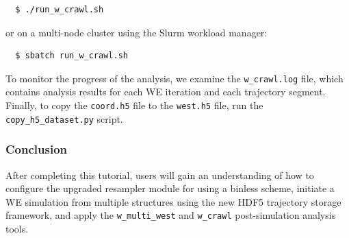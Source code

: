 \begin{verbatim}
  $ ./run_w_crawl.sh
\end{verbatim}

or on a multi-node cluster using the Slurm workload manager:

\begin{verbatim}
  $ sbatch run_w_crawl.sh
\end{verbatim}

To monitor the progress of the analysis, we examine the \verb|w_crawl.log| file, which contains analysis results for each WE iteration and each trajectory segment.
Finally, to copy the \verb|coord.h5| file to the \verb|west.h5| file, run the \verb|copy_h5_dataset.py| script.

\subsubsection{Conclusion} After completing this tutorial, users will gain an understanding of how to configure the upgraded resampler module for using a binless scheme, initiate a WE simulation from multiple structures using the new HDF5 trajectory storage framework, and apply the \verb|w_multi_west| and \verb|w_crawl| post-simulation analysis tools. 